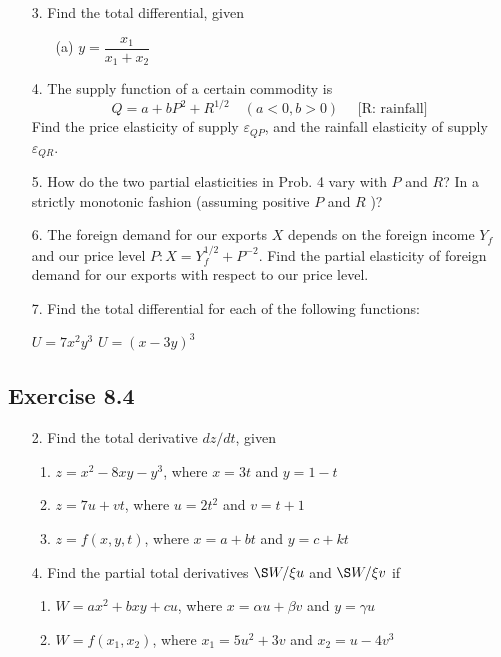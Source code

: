 \documentclass{./../../Latex/homework}
\begin{document}
\begin{enumerate}

\item[3.] Find the total differential, given
\begin{itemize}
\item[(a)]$y=\dfrac{x_{1}}{x_{1}+x_{2}}$
\end{itemize}

\item[4.] The supply function of a certain commodity is
$$
Q=a+b P^{2}+R^{1 / 2} \quad(a<0, b>0) \quad \text { [R: rainfall] }
$$
Find the price elasticity of supply $\varepsilon_{Q P}$, and the rainfall elasticity of supply $\varepsilon_{Q R}$. 
\item[5.] How do the two partial elasticities in Prob. 4 vary with $P$ and $R$? In a strictly monotonic fashion (assuming positive $P$ and $R$ )?


\item[6.] The foreign demand for our exports $X$ depends on the foreign income $Y_{f}$ and our price level $P: X=Y_{f}^{1 / 2}+P^{-2}$. Find the partial elasticity of foreign demand for our exports with respect to our price level.

\item[7.] Find the total differential for each of the following functions:
\begin{tasks}
\task[(b)] $U=7 x^{2} y^{3}$
\task[(f)] $U=(x-3 y)^{3}$
\end{tasks}

\end{enumerate}

\subsection*{Exercise 8.4}

\begin{enumerate}

\item[2.] Find the total derivative $d z / d t$, given
\begin{enumerate}
\item $z=x^{2}-8 x y-y^{3}$, where $x=3 t$ and $y=1-t$ 
\item $z=7 u+v t$, where $u=2 t^{2}$ and $v=t+1$
\item $z=f(x, y, t)$, where $x=a+b t$ and $y=c+k t$
\end{enumerate}

\item[4.] Find the partial total derivatives $\S W / \xi u$ and $\S W / \xi v$ if
\begin{enumerate}
\item $W=a x^{2}+b x y+c u$, where $x=\alpha u+\beta v$ and $y=\gamma u$
\item $W=f\left(x_{1}, x_{2}\right)$, where $x_{1}=5 u^{2}+3 v$ and $x_{2}=u-4 v^{3}$
\end{enumerate}
\end{enumerate}
\end{document}
